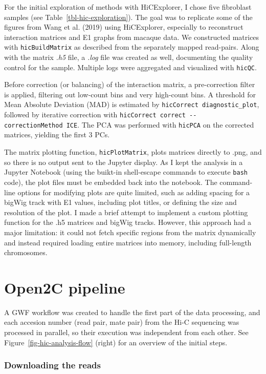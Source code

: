 \documentclass[
  11pt,
  a4paper,
]{scrbook}
\begin{document}
For the initial exploration of methods with HiCExplorer, I chose five
fibroblast samples (see Table~\ref{tbl-hic-exploration}). The goal was
to replicate some of the figures from Wang et al. (2019) using
HiCExplorer, especially to reconstruct interaction matrices and E1
graphs from macaque data. We constructed matrices with
\texttt{hicBuildMatrix} as described from the separately mapped
read-pairs. Along with the matrix \emph{.h5} file, a \emph{.log} file
was created as well, documenting the quality control for the sample.
Multiple logs were aggregated and visualized with \texttt{hicQC}.

Before correction (or balancing) of the interaction matrix, a
pre-correction filter is applied, filtering out low-count bins and very
high-count bins. A threshold for Mean Absolute Deviation (MAD) is
estimated by \texttt{hicCorrect\ diagnostic\_plot}, followed by
iterative correction with
\texttt{hicCorrect\ correct\ -\/-correctionMethod\ ICE}. The PCA was
performed with \texttt{hicPCA} on the corrected matrices, yielding the
first 3 PCs.

The matrix plotting function, \texttt{hicPlotMatrix}, plots matrices
directly to .png, and so there is no output sent to the Jupyter display.
As I kept the analysis in a Jupyter Notebook (using the buikt-in
shell-escape commands to execute \texttt{bash} code), the plot files
must be embedded back into the notebook. The command-line options for
modifying plots are quite limited, such as adding spacing for a bigWig
track with E1 values, including plot titles, or defining the size and
resolution of the plot. I made a brief attempt to implement a custom
plotting function for the .h5 matrices and bigWig tracks. However, this
approach had a major limitation: it could not fetch specific regions
from the matrix dynamically and instead required loading entire matrices
into memory, including full-length chromosomes.

\section{Open2C pipeline}\label{open2c-pipeline}

A GWF workflow was created to handle the first part of the data
processing, and each accesion number (read pair, mate pair) from the
Hi-C sequencing was processed in parallel, so their execution was
independent from each other. See Figure~\ref{fig-hic-analysis-flow}
(right) for an overview of the initial steps.

\subsubsection{Downloading the reads}\label{downloading-the-reads}
\end{document}
